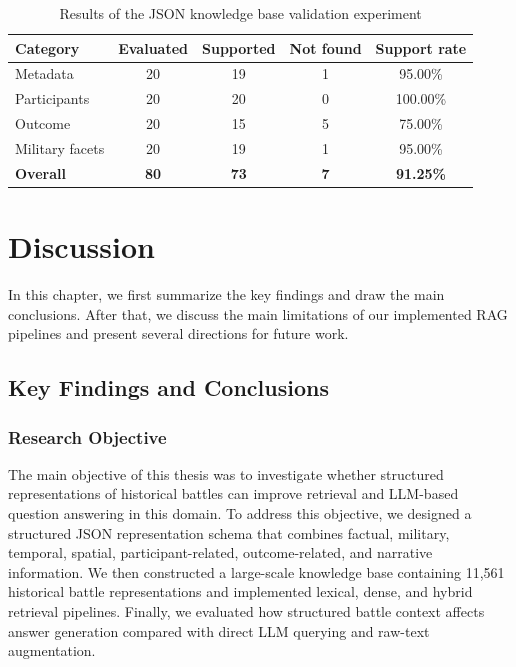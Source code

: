 \begin{table}[H]
\centering
\caption{Results of the JSON knowledge base validation experiment}
\label{tab:json_kb_validation_results}

\footnotesize
\renewcommand{\arraystretch}{1.3}
\setlength{\tabcolsep}{5pt}

\begin{tabular}{
    >{\RaggedRight\arraybackslash}p{}
    c
    c
    c
    c
}
\toprule
\textbf{Category} &
\textbf{Evaluated} &
\textbf{Supported} &
\textbf{Not found} &
\textbf{Support rate} \\
\midrule

Metadata & 20 & 19 & 1 & 95.00\% \\

Participants & 20 & 20 & 0 & 100.00\% \\

Outcome & 20 & 15 & 5 & 75.00\% \\

Military facets & 20 & 19 & 1 & 95.00\% \\

\midrule

\textbf{Overall} &
\textbf{80} &
\textbf{73} &
\textbf{7} &
\textbf{91.25\%} \\

\bottomrule
\end{tabular}
\end{table}

\chapter{Discussion}
In this chapter, we first summarize the key findings and draw the main conclusions. After that, we discuss the main limitations of our implemented RAG pipelines and present several directions for future work.
\section{Key Findings and Conclusions}
\subsection{Research Objective}
The main objective of this thesis was to investigate whether structured representations of historical battles can improve retrieval and LLM-based question answering in this domain. To address this objective, we designed a structured JSON representation schema that combines factual, military, temporal, spatial, participant-related, outcome-related, and narrative information. We then constructed a large-scale knowledge base containing 11,561 historical battle representations and implemented lexical, dense, and hybrid retrieval pipelines. Finally, we evaluated how structured battle context affects answer generation compared with direct LLM querying and raw-text augmentation.
